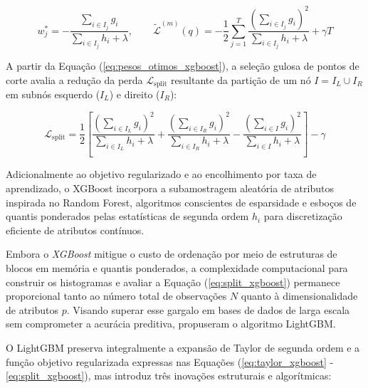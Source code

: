 \begin{equation}
    w_j^* = -\frac{\sum_{i \in I_j} g_i}{\sum_{i \in I_j} h_i + \lambda}, \qquad \tilde{\mathcal{L}}^{(m)}(q) = -\frac{1}{2} \sum_{j=1}^{T} \frac{\left(\sum_{i \in I_j} g_i\right)^2}{\sum_{i \in I_j} h_i + \lambda} + \gamma T \label{eq:pesos_otimos_xgboost}
\end{equation}

\noindent A partir da Equação (\ref{eq:pesos_otimos_xgboost}), a seleção gulosa de pontos de corte avalia a redução da perda $\mathcal{L}_{\text{split}}$ resultante da partição de um nó $I = I_L \cup I_R$ em subnós esquerdo ($I_L$) e direito ($I_R$):

\begin{equation}
    \mathcal{L}_{\text{split}} = \frac{1}{2} \left[ \frac{\left(\sum_{i \in I_L} g_i\right)^2}{\sum_{i \in I_L} h_i + \lambda} + \frac{\left(\sum_{i \in I_R} g_i\right)^2}{\sum_{i \in I_R} h_i + \lambda} - \frac{\left(\sum_{i \in I} g_i\right)^2}{\sum_{i \in I} h_i + \lambda} \right] - \gamma \label{eq:split_xgboost}
\end{equation}

\noindent Adicionalmente ao objetivo regularizado e ao encolhimento por taxa de aprendizado, o XGBoost incorpora a subamostragem aleatória de atributos inspirada no Random Forest, algoritmos conscientes de esparsidade e esboços de quantis ponderados pelas estatísticas de segunda ordem $h_i$ para discretização eficiente de atributos contínuos.

Embora o \textit{XGBoost} mitigue o custo de ordenação por meio de estruturas de blocos em memória e quantis ponderados, a complexidade computacional para construir os histogramas e avaliar a Equação (\ref{eq:split_xgboost}) permanece proporcional tanto ao número total de observações $N$ quanto à dimensionalidade de atributos $p$. Visando superar esse gargalo em bases de dados de larga escala sem comprometer a acurácia preditiva,  propuseram o algoritmo LightGBM.

O LightGBM preserva integralmente a expansão de Taylor de segunda ordem e a função objetivo regularizada expressas nas Equações (\ref{eq:taylor_xgboost} - \ref{eq:split_xgboost}), mas introduz três inovações estruturais e algorítmicas:

